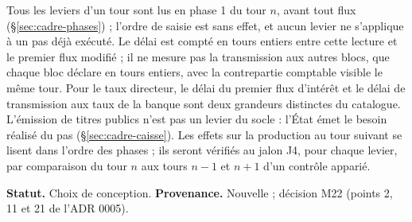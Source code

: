 \documentclass[11pt,a4paper]{article}
\begin{document}
\begin{proposee}
Tous les leviers d'un tour sont lus en phase 1 du tour $n$, avant tout flux (\S\ref{sec:cadre-phases}) ; l'ordre de saisie est sans effet, et aucun levier ne s'applique à un pas déjà exécuté. Le délai est compté en tours entiers entre cette lecture et le premier flux modifié ; il ne mesure pas la transmission aux autres blocs, que chaque bloc déclare en tours entiers, avec la contrepartie comptable visible le même tour. Pour le taux directeur, le délai du premier flux d'intérêt et le délai de transmission aux taux de la banque sont deux grandeurs distinctes du catalogue. L'émission de titres publics n'est pas un levier du socle : l'État émet le besoin réalisé du pas (\S\ref{sec:cadre-caisse}). Les effets sur la production au tour suivant se lisent dans l'ordre des phases ; ils seront vérifiés au jalon J4, pour chaque levier, par comparaison du tour $n$ aux tours $n-1$ et $n+1$ d'un contrôle apparié.

\textbf{Statut.} Choix de conception. \textbf{Provenance.} Nouvelle ; décision M22 (points 2, 11 et 21 de l'ADR 0005).
\end{proposee}
\end{document}
